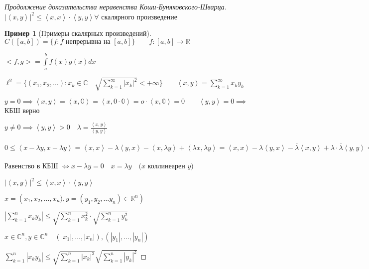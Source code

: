 \documentclass{book}
\newcommand\R{\ensuremath{\mathbb{R}}}
\renewcommand\C{\ensuremath{\mathbb{C}}}
\newcommand{\ov}[1]{\overline{#1}}
\theoremstyle{definition}
\newtheorem*{example}{Пример}
\begin{document}
\begin{proof}
    [Продолжение доказательства неравенства Коши-Буняковского-Шварца]

    $\left| \left< x, y \right> \right| ^2 \leqslant \left<x, x \right> \cdot  \left< y, y \right> \forall $ скалярного произведение

    \begin{example}
        [Примеры скалярных произведений]

        $C\left( [a,b] \right)  = \{f: f\text{ непрерывна на }[a,b]\}\qquad f:[a,b] \to  \R$

        $<f,g> = \int \limits_a^b f(x)g(x)dx$

        $\ell ^2 = \{(x_1, x_2, \ldots):x_k\in \C\quad \sqrt{ \sum_{k=1}^{\infty } \left| x_k \right|^2} <+\infty  \}\qquad \left< x,y \right> = \sum_{k=1}^{\infty } x_ky_k$
    \end{example}

    $y=0 \implies \left< x, y \right> = \left< x,\mathbb{0} \right> = \left< x, 0\cdot \mathbb{0} \right> = o\cdot \left< x, \mathbb{0} \right> = 0\qquad \left< y, y \right> = 0\implies $ КБШ верно

    $y\neq 0 \implies  \left< y, y \right> >0\quad \lambda = \frac{\left< x, y \right>}{\left< y, y \right>}$

    $0\leqslant \left< x-\lambda y, x-\lambda y \right> = \left< x, x \right> - \lambda \left< y, x \right> - \left< x, \lambda y \right> + \left< \lambda x, \lambda y \right> = \left< x, x \right> - \lambda \left< y, x \right> - \ov{\lambda} \left< x, y \right> + \lambda \cdot  \ov{\lambda} \left< y, y \right> = \left< x, x \right> - \frac{\left| \left< x, y \right> \right| ^2}{\left< y, y \right>} - \frac{\left| \left< x, y \right> \right| ^2}{\left< y, y \right>} + \frac{\left| \left< x, y \right> \right| ^2}{\left< y, y \right>} \implies  \left< x, x \right>\cdot \left< y, y \right> - \left| \left< x, y \right> \right| ^2 \geqslant 0$ 

    Равенство в КБШ $\iff  x-\lambda y = 0\quad x = \lambda y\quad (x$ коллинеарен $y)$  

    $\left| \left< x, y \right> \right| ^2 \leqslant \left< x, x \right> \cdot  \left< y, y \right>$

    $x = \left( x_1, x_2, \ldots, x_{n} ), y = \left( y_1, y_2, \ldots y_{n}  \right)  \in \R^n \right) $

    $\left| \sum_{k=1}^{n} x_{k} y_{k}\right| \leqslant \sqrt{\sum_{k=1}^{n} x_k^2} \cdot \sqrt{\sum_{k=1}^{n} y_k^2}  $

    $x\in \C^n, y\in \C^n\quad \left( |x_1|, \ldots, |x_{n} |\right), \left( |y_1|, \ldots, |y_{n} | \right)   $

    $\sum_{k=1}^{n} |x_ky_k| \leqslant \sqrt{\sum_{k=1}^{n} |x_k|^2} \sqrt{\sum_{k=1}^{n} |y_k|^2}  $
\end{proof}
\end{document}
